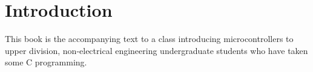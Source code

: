 \chapter{Introduction}

This book is the accompanying text to a class introducing microcontrollers
to upper division, non-electrical engineering undergraduate students who 
have taken some C programming.